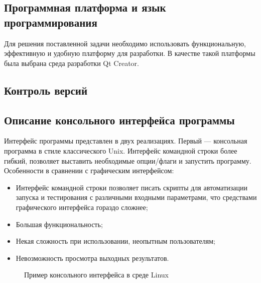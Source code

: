 \subsection {Программная платформа и язык программирования}
Для решения поставленной задачи необходимо использовать функциональную, эффективную и удобную платформу для разработки. В качестве такой платформы была выбрана среда разработки Qt Creator.

\subsection {Контроль версий}

\subsection{Описание консольного интерфейса программы}%
Интерфейс программы представлен в двух реализациях.
Первый — консольная программа в стиле классического Unix. Интерфейс командной строки более гибкий, позволяет выставить необходимые опции/флаги и запустить программу. Особенности в сравнении с графическим интерфейсом:
\begin{itemize}
\item Интерфейс командной строки позволяет писать скрипты для автоматизации запуска и тестирования с различными входными параметрами, что средствами графического интерфейса гораздо сложнее;
\item Большая функциональность;
\item Некая сложность при использовании, неопытным пользователям;
\item Невозможность просмотра выходных результатов.
\end{itemize}

\begin{figure}[ht]
\caption{Пример консольного интерфейса в среде Linux}
\label{pic:con_scr}
\end{figure}

